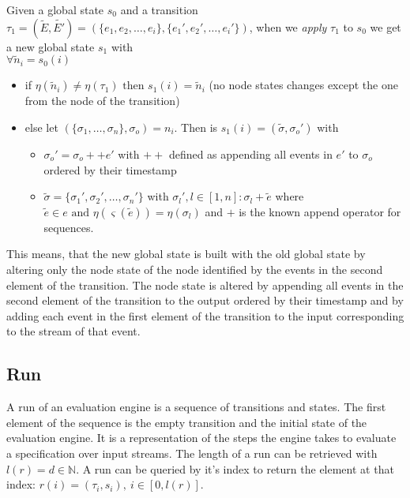 \begin{definition}[name = Application of a Transition on a State]\label{sec:concepts:def:application_transition}
  Given a global state \(s_0\) and a transition \(\tau_1 = (\widetilde{E}, \widetilde{E'}) = (\{e_1,e_2,\dots,e_i\}, \{e_1',e_2',\dots,e_i'\})\), when we \emph{apply} \(\tau_1\) to \(s_0\) we get a new global state \(s_1\) with\\
  \(\forall \widetilde{n}_i = s_0(i)\)
  \begin{itemize}
    \item if \(\eta(\widetilde{n}_i) \neq \eta(\tau_1) \text{ then } s_1(i) = \widetilde{n}_i\) (no node states changes except the one from the node of the transition)
    \item else let \((\{\sigma_1,\dots,\sigma_n\}, \sigma_o) = n_i\). Then is \(s_1(i) = (\widetilde{\sigma}, \sigma_o')\) with
      \begin{itemize}
        \item \(\sigma_o' = \sigma_o ++ e'\) with \(++\) defined as appending all events in \(e'\) to \(\sigma_o\) ordered by their timestamp
        \item \(\widetilde{\sigma} = \{\sigma_1', \sigma_2', \dots, \sigma_n'\}\) with \(\sigma_l', l \in [1,n]: \sigma_l + \widetilde{e}\) where \(\widetilde{e} \in e \text{ and } \eta(\varsigma(\widetilde{e})) = \eta(\sigma_l)\) and \(+\) is the known append operator for sequences.
      \end{itemize}
  \end{itemize}

\end{definition}

This means, that the new global state is built with the old global state by altering only the node state of the node identified by the events in the second element of the transition.
The node state is altered by appending all events in the second element of the transition to the output ordered by their timestamp and by adding each event in the first element of the transition to the input corresponding to the stream of that event.

\subsection{Run}
\label{sec:concepts:def:run}

A run of an evaluation engine is a sequence of transitions and states.
The first element of the sequence is the empty transition and the initial state of the evaluation engine.
It is a representation of the steps the engine takes to evaluate a specification over input streams.
The length of a run can be retrieved with \(l(r) = d \in \mathbb{N}\).
A run can be queried by it's index to return the element at that index: \(r(i)=(\tau_i, s_i),\ i \in [0, l(r)]\).

